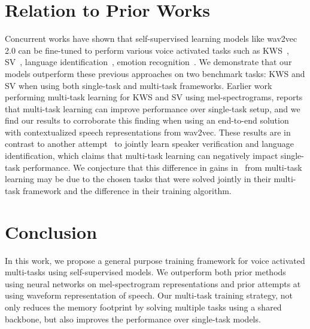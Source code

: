 \documentclass{article}
\begin{document}
\section{Relation to Prior Works}
Concurrent works have shown that self-supervised learning models like wav2vec 2.0 can be fine-tuned to perform various voice activated tasks such as KWS~\cite{seo2021wav2kws}, SV~\cite{exploringSVLID}, language identification~\cite{exploringSVLID}, emotion recognition~\cite{pepino2021emotion}.
We demonstrate that our models outperform these previous approaches on two benchmark tasks: KWS and SV when using both single-task and multi-task frameworks. 
Earlier work~\cite{jung2020improving} performing multi-task learning for KWS and SV using mel-spectrograms, reports that multi-task learning can improve performance over single-task setup, and we find our results to corroborate this finding when using an end-to-end solution with contextualized speech representations from wav2vec. These results are in contrast to another attempt~\cite{exploringSVLID} to jointly learn speaker verification and language identification, which claims that multi-task learning can negatively impact single-task performance. We conjecture that this difference in gains in~\cite{exploringSVLID} from multi-task learning may be due to the chosen tasks that were solved jointly in their multi-task framework and the difference in their training algorithm.

\vspace{-3mm}
\section{Conclusion}
In this work, we propose a general purpose training framework for voice activated multi-tasks using self-supervised models. We outperform both prior methods using neural networks on mel-spectrogram representations and prior attempts at using waveform representation of speech. Our multi-task training strategy, not only reduces the memory footprint by solving multiple tasks using a shared backbone, but also improves the performance over single-task models.



\end{document}
